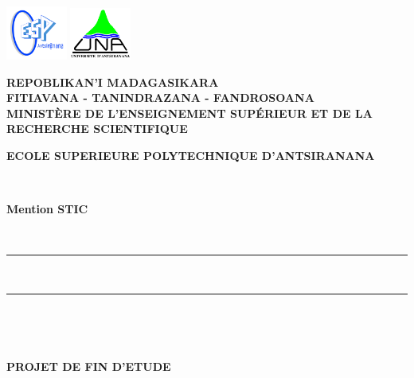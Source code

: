 \documentclass[12pt,a4paper]{report}
\begin{document}
	
 \begin{titlepage}
 	\includegraphics[width=0.15\textwidth]{logo_espa}
 	\hfill \includegraphics[width=0.15\textwidth]{logo_una}\\
 	\parbox{9cm}{
 		\begin{center}
 			\vspace*{-30 mm}\large\textbf{REPOBLIKAN'I MADAGASIKARA}\\
 			\small\textbf{FITIAVANA - TANINDRAZANA - FANDROSOANA}\\
 			\vspace*{0.2 cm}
 			\normalsize\textbf{MINISTÈRE DE L'ENSEIGNEMENT SUPÉRIEUR ET DE LA RECHERCHE SCIENTIFIQUE}\\
 		\end{center}
 	}
 	\centering
 	\parbox{\textwidth}{
 		\begin{center}
 			\vspace*{4 mm} 
 			\normalsize\large\textbf{ECOLE SUPERIEURE POLYTECHNIQUE D'ANTSIRANANA}
 		\end{center}
 	}
 	\\
 	\centering\parbox{\textwidth}{
 		\begin{center}
 			\large\textbf{Mention STIC} 
 		\end{center}			
 	}
 	\\
 	\centering\parbox{\textwidth}{
 		\begin{center}
 			\color{black}\rule{\textwidth}{1.5pt}\\
 			\vspace*{-0.42 cm}
 			\rule{\textwidth}{0.5pt}\\
 		\end{center}			
 	}\\
 	\vspace*{-0.7 cm}
 	\centering\parbox{\textwidth}{
 		\begin{center}
 			\begin{normalsize}
 				\color{black} 
 				\textbf{PROJET DE FIN D'ETUDE}
 			\end{normalsize}

\end{center}}
\end{titlepage}
\end{document}

